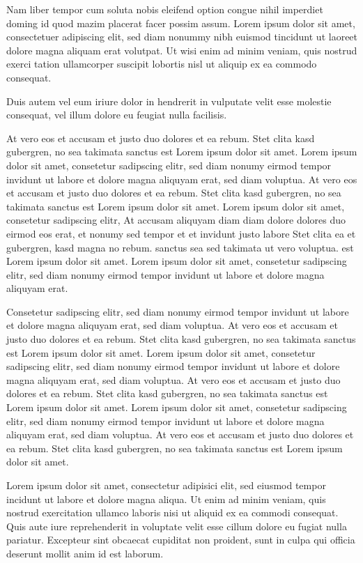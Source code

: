 \documentclass[a4paper]{article}
\begin{document}
Nam liber tempor cum soluta nobis eleifend option congue nihil imperdiet doming
id quod mazim placerat facer possim assum. Lorem ipsum dolor sit amet,
consectetuer adipiscing elit, sed diam nonummy nibh euismod tincidunt ut
laoreet dolore magna aliquam erat volutpat. Ut wisi enim ad minim veniam, quis
nostrud exerci tation ullamcorper suscipit lobortis nisl ut aliquip ex ea
commodo consequat.

Duis autem vel eum iriure dolor in hendrerit in vulputate velit esse molestie
consequat, vel illum dolore eu feugiat nulla facilisis.

At vero eos et accusam et justo duo dolores et ea rebum. Stet clita kasd
gubergren, no sea takimata sanctus est Lorem ipsum dolor sit amet. Lorem ipsum
dolor sit amet, consetetur sadipscing elitr, sed diam nonumy eirmod tempor
invidunt ut labore et dolore magna aliquyam erat, sed diam voluptua. At vero
eos et accusam et justo duo dolores et ea rebum. Stet clita kasd gubergren, no
sea takimata sanctus est Lorem ipsum dolor sit amet. Lorem ipsum dolor sit
amet, consetetur sadipscing elitr, At accusam aliquyam diam diam dolore dolores
duo eirmod eos erat, et nonumy sed tempor et et invidunt justo labore Stet
clita ea et gubergren, kasd magna no rebum. sanctus sea sed takimata ut vero
voluptua. est Lorem ipsum dolor sit amet. Lorem ipsum dolor sit amet,
consetetur sadipscing elitr, sed diam nonumy eirmod tempor invidunt ut labore
et dolore magna aliquyam erat.

Consetetur sadipscing elitr, sed diam nonumy eirmod tempor invidunt ut labore
et dolore magna aliquyam erat, sed diam voluptua. At vero eos et accusam et
justo duo dolores et ea rebum. Stet clita kasd gubergren, no sea takimata
sanctus est Lorem ipsum dolor sit amet. Lorem ipsum dolor sit amet, consetetur
sadipscing elitr, sed diam nonumy eirmod tempor invidunt ut labore et dolore
magna aliquyam erat, sed diam voluptua. At vero eos et accusam et justo duo
dolores et ea rebum. Stet clita kasd gubergren, no sea takimata sanctus est
Lorem ipsum dolor sit amet. Lorem ipsum dolor sit amet, consetetur sadipscing
elitr, sed diam nonumy eirmod tempor invidunt ut labore et dolore magna aliquyam
erat, sed diam voluptua. At vero eos et accusam et justo duo dolores et ea
rebum. Stet clita kasd gubergren, no sea takimata sanctus est Lorem ipsum dolor
sit amet.

Lorem ipsum dolor sit amet, consectetur adipisici elit, sed eiusmod tempor
incidunt ut labore et dolore magna aliqua. Ut enim ad minim veniam, quis
nostrud exercitation ullamco laboris nisi ut aliquid ex ea commodi consequat.
Quis aute iure reprehenderit in voluptate velit esse cillum dolore eu fugiat
nulla pariatur. Excepteur sint obcaecat cupiditat non proident, sunt in culpa
qui officia deserunt mollit anim id est laborum.
\end{document}
